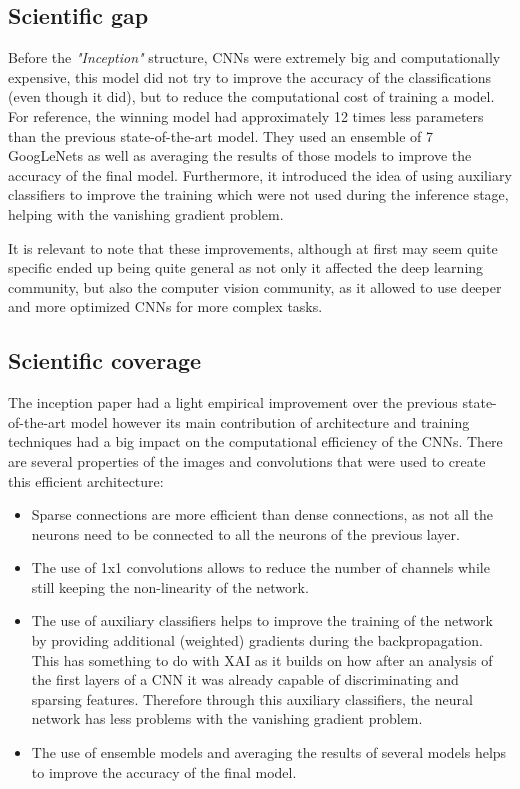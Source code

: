 \documentclass[12pt]{article}
\begin{document}
\vspace{0.5cm}

\subsection*{Scientific gap}

Before the \textit{"Inception"} structure, CNNs were extremely big and computationally expensive, this model did not try to improve 
the accuracy of the classifications (even though it did), but to reduce the computational cost of training a model. For reference, 
the winning model had approximately 12 times less parameters than the previous state-of-the-art model. They used an ensemble of 7 
GoogLeNets as well as averaging the results of those models to improve the accuracy of the final model. Furthermore, it introduced
the idea of using auxiliary classifiers to improve the training which were not used during the inference stage, helping with the vanishing gradient problem.

\vspace{0.5cm}

It is relevant to note that these improvements, although at first may seem quite specific ended up being quite general as not only it affected the deep 
learning community, but also the computer vision community, as it allowed to use deeper and more optimized CNNs for more complex tasks.

\vspace{0.5cm}

\subsection*{Scientific coverage}

The inception paper had a light empirical improvement over the previous state-of-the-art model however its main contribution of architecture and 
training techniques had a big impact on the computational efficiency of the CNNs. There are several properties of the images and 
convolutions that were used to create this efficient architecture:
\begin{itemize}
    \item Sparse connections are more efficient than dense connections, as not all the neurons need to be connected to all the neurons of the previous layer.
    \item The use of 1x1 convolutions allows to reduce the number of channels while still keeping the non-linearity of the network.
    \item The use of auxiliary classifiers helps to improve the training of the network by providing additional (weighted) gradients during the backpropagation.
This has something to do with XAI as it builds on how after an analysis of the first layers of a CNN it was already capable of discriminating and sparsing features.
Therefore through this auxiliary classifiers, the neural network has less problems with the vanishing gradient problem.
    \item The use of ensemble models and averaging the results of several models helps to improve the accuracy of the final model.
\end{itemize}
\end{document}
